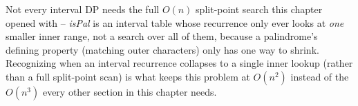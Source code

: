 \begin{takeawaybox}
Not every interval DP needs the full $O(n)$ split-point search this
chapter opened with -- \textit{isPal} is an interval table whose
recurrence only ever looks at \emph{one} smaller inner range, not a
search over all of them, because a palindrome's defining property
(matching outer characters) only has one way to shrink. Recognizing
when an interval recurrence collapses to a single inner lookup (rather
than a full split-point scan) is what keeps this problem at $O(n^2)$
instead of the $O(n^3)$ every other section in this chapter needs.
\end{takeawaybox}
